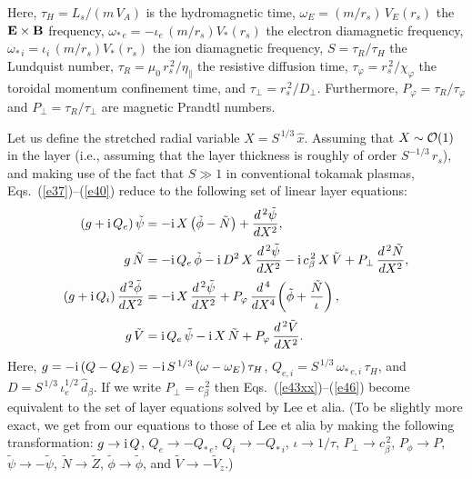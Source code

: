 \documentclass[12pt,prb,aps]{revtex4-1}
\begin{document}
Here, 
$\tau_H = L_s/(m\,V_A)$ 
is the  hydromagnetic time, 
$\omega_E =(m/r_s)\,V_E(r_s)$
  the 
 ${\bf E}\times {\bf B}$ frequency, 
$\omega_{\ast\,e} = -\iota_e\,(m/r_s)V_\ast(r_s)$
the electron diamagnetic frequency,
$\omega_{\ast\,i} =\iota_i\,(m/r_s)V_\ast(r_s)$
 the  ion diamagnetic frequency,  $S=\tau_R/\tau_H$ the  Lundquist number, 
$\tau_R = \mu_0\,r_s^{\,2}/\eta_\parallel$
 the
 resistive diffusion time, 
$\tau_\varphi
= r_s^{\,2}/\chi_\varphi$
the  toroidal momentum confinement time, and 
$\tau_\perp = r_s^{\,2}/D_\perp$.
  Furthermore, $P_\varphi = \tau_R/\tau_\varphi$ and $P_\perp = \tau_R/\tau_\perp$ are magnetic Prandtl numbers.

 Let us define the stretched radial variable $X = S^{\,1/3}\,\hat{x}$.
Assuming that $X\sim{\cal O}(1)$ in the layer (i.e., assuming that the layer thickness is roughly of order $S^{-1/3}\,r_s$),
and making use of the fact that $S\gg 1$ in conventional tokamak plasmas,  Eqs.~(\ref{e37})--(\ref{e40}) reduce to the following
set of linear layer equations:\,\cite{cole}
\begin{align}\label{e43xx}
(g+{\rm i}\,Q_e)\,\tilde{\psi}&= - {\rm i}\,X\left(\tilde{\phi}-\tilde{N}\right)+ \frac{d^{\,2}\tilde{\psi}}{d X^2},\\[0.5ex]
g\,\tilde{N} &= - {\rm i}\,Q_{e}\,\tilde{\phi}   - {\rm i} \,D^{2}\,X\,\frac{d^{\,2}\tilde{\psi}}{dX^{2}}- {\rm i}\,c_\beta^{\,2}\,X\,\tilde{V}
+ P_\perp\,\frac{d^{\,2} \tilde{N}}{dX^{2}},\label{e44xx}\\[0.5ex]
(g+{\rm i}\,Q_i)\,\frac{d^{\,2}\tilde{\phi}}{dX^2}&= - {\rm i}\,X\,\frac{d^{\,2}\tilde{\psi}}{dX^2}+ P_\varphi\,\frac{d^{\,4}}{dX^4}\!\left(\tilde{\phi} + \frac{\tilde{N}}{\iota}\right),\\[0.5ex]
g\,\tilde{V} &= {\rm i}\,Q_{e}\,\tilde{\psi} - {\rm i}\,X\,\tilde{N} + P_\varphi\,\frac{d^{\,2}\tilde{V}}{dX^{2}}.\label{e46}
\end{align}
Here, $g = -{\rm i}\,(Q-Q_E)=-{\rm i}\,S^{\,1/3}\,(\omega-\omega_E)\,\tau_H$, $Q_{e,i} = S^{\,1/3}\,\omega_{\ast\,e,i}\,\tau_H$,
and $D = S^{\,1/3}\,\iota_e^{1/2}\,\hat{d}_\beta$. If we write $P_\perp = c_\beta^{\,2}$
then Eqs.~(\ref{e43xx})--(\ref{e46}) become equivalent to the set of  layer equations solved by Lee et alia. (To be slightly more exact, we
get from our equations to those of Lee et alia by making the following transformation: $g\rightarrow {\rm i}\,Q$, $Q_e\rightarrow -Q_{\ast\,e}$, $Q_i\rightarrow -Q_{\ast\,i}$, $\iota\rightarrow 1/\tau$, $P_\perp\rightarrow c_\beta^{\,2}$,
 $P_\phi\rightarrow P$, $\tilde{\psi}\rightarrow-\tilde{\psi}$, $\tilde{N}\rightarrow \tilde{Z}$, $\tilde{\phi}\rightarrow\tilde{\phi}$, and
$\tilde{V}\rightarrow-\tilde{V}_z$.)
\end{document}
